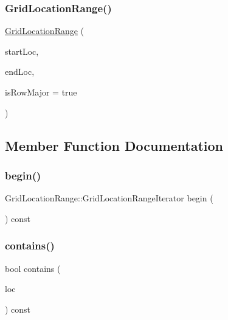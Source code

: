 \mbox{\label{classGridLocationRange_ad6f1526ab7c2ba9728acc147e3371a38}} 
\subsubsection{\texorpdfstring{Grid\+Location\+Range()}{GridLocationRange()}\hspace{0.1cm}{\footnotesize\ttfamily [2/2]}}
{\footnotesize\ttfamily \mbox{\hyperlink{classGridLocationRange}{Grid\+Location\+Range}} (\begin{DoxyParamCaption}\item[{const \mbox{\hyperlink{structGridLocation}{Grid\+Location}} \&}]{start\+Loc,  }\item[{const \mbox{\hyperlink{structGridLocation}{Grid\+Location}} \&}]{end\+Loc,  }\item[{bool}]{is\+Row\+Major = {\ttfamily true} }\end{DoxyParamCaption})}



\subsection{Member Function Documentation}
\mbox{\label{classGridLocationRange_abd833755fc74d34b27fcb7dafdf91ce2}} 
\subsubsection{\texorpdfstring{begin()}{begin()}}
{\footnotesize\ttfamily Grid\+Location\+Range\+::\+Grid\+Location\+Range\+Iterator begin (\begin{DoxyParamCaption}{ }\end{DoxyParamCaption}) const}

\mbox{\label{classGridLocationRange_abda665ef6af1d9cc75c51829724d8bee}} 
\subsubsection{\texorpdfstring{contains()}{contains()}}
{\footnotesize\ttfamily bool contains (\begin{DoxyParamCaption}\item[{const \mbox{\hyperlink{structGridLocation}{Grid\+Location}} \&}]{loc }\end{DoxyParamCaption}) const}

